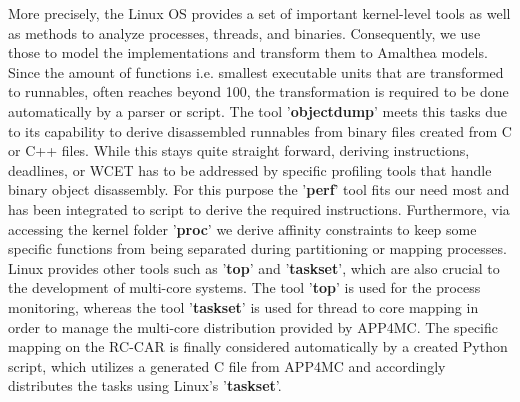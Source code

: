\documentclass [a4paper,final,conference,10pt]{IDAACS}
\begin{document}
More precisely, the Linux OS provides a set of important kernel-level tools as well as methods to analyze processes, threads, and binaries. Consequently, we use those to model the implementations and transform them to Amalthea models. Since the amount of functions i.e. smallest executable units that are transformed to runnables, often reaches beyond 100, the transformation is required to be done automatically by a parser or script. The tool '\textbf{objectdump}' meets this tasks due to its capability to derive disassembled runnables from binary files created from C or C++ files. While this stays quite straight forward, deriving instructions, deadlines, or WCET has to be addressed by specific profiling tools that handle binary object disassembly. For this purpose the '\textbf{perf}' tool fits our need most and has been integrated to script to derive the required instructions. Furthermore, via accessing the kernel folder '\textbf{proc}' we derive affinity constraints to keep some specific functions from being separated during partitioning or mapping processes. 
Linux provides other tools such as '\textbf{top}' and '\textbf{taskset}', which are also crucial to the development of multi-core systems. The tool '\textbf{top}' is used for the process monitoring, whereas the tool '\textbf{taskset}' is used for thread to core mapping in order to manage the multi-core distribution provided by APP4MC.
The specific mapping on the RC-CAR is finally considered automatically by a created Python script, which utilizes a generated C file from APP4MC and accordingly distributes the tasks using Linux's '\textbf{taskset}'.
\end{document}
